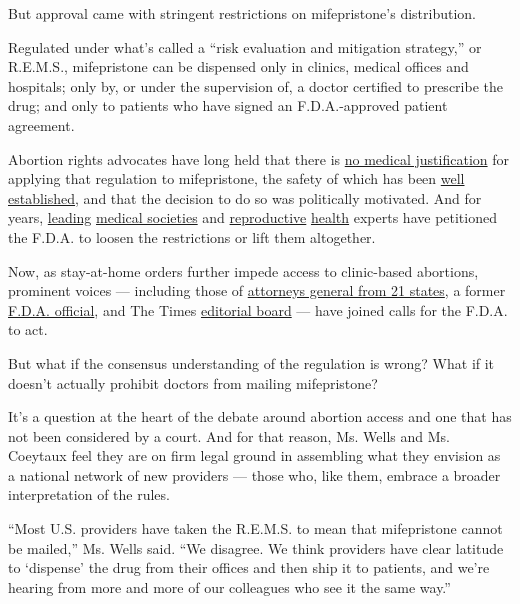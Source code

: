 But approval came with stringent restrictions on mifepristone's
distribution.

Regulated under what's called a ``risk evaluation and mitigation
strategy,'' or R.E.M.S., mifepristone can be dispensed only in clinics,
medical offices and hospitals; only by, or under the supervision of, a
doctor certified to prescribe the drug; and only to patients who have
signed an F.D.A.-approved patient agreement.

Abortion rights advocates have long held that there is
\href{https://www.vice.com/en_us/article/vb5vzd/fda-abortion-pill-regulations-controversy}{no
medical justification} for applying that regulation to mifepristone, the
safety of which has been
\href{https://www.nejm.org/doi/full/10.1056/NEJMsb1612526}{well
established}, and that the decision to do so was politically motivated.
And for years,
\href{https://www.aafp.org/dam/AAFP/documents/advocacy/prevention/women/LT-FDA-MifepristoneREMS-062019.pdf}{leading}
\href{https://policysearch.ama-assn.org/policyfinder/detail/mifepristone?uri=\%2FAMADoc\%2FHOD.xml-H-100.948.xml}{medical
societies} and
\href{https://www.nejm.org/doi/full/10.1056/NEJMp1908305}{reproductive}
\href{https://emaaproject.org/}{health} experts have petitioned the
F.D.A. to loosen the restrictions or lift them altogether.

Now, as stay-at-home orders further impede access to clinic-based
abortions, prominent voices --- including those of
\href{https://ag.ny.gov/sites/default/files/final_ag_letter_hhs_medication_abortion_2020.pdf}{attorneys
general from 21 states}, a former
\href{https://thehill.com/opinion/healthcare/494914-the-uk-allows-home-use-of-the-abortion-pill-the-us-should-do-the-same}{F.D.A.
official}, and The Times
\href{https://www.nytimes.com/2020/03/26/opinion/abortion-law-coronavirus.html}{editorial
board} --- have joined calls for the F.D.A. to act.

But what if the consensus understanding of the regulation is wrong? What
if it doesn't actually prohibit doctors from mailing mifepristone?

It's a question at the heart of the debate around abortion access and
one that has not been considered by a court. And for that reason, Ms.
Wells and Ms. Coeytaux feel they are on firm legal ground in assembling
what they envision as a national network of new providers --- those who,
like them, embrace a broader interpretation of the rules.

``Most U.S. providers have taken the R.E.M.S. to mean that mifepristone
cannot be mailed,'' Ms. Wells said. ``We disagree. We think providers
have clear latitude to `dispense' the drug from their offices and then
ship it to patients, and we're hearing from more and more of our
colleagues who see it the same way.''


